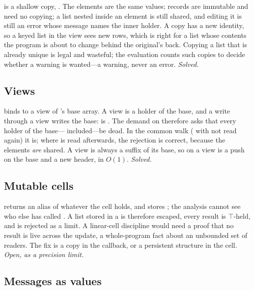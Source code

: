  is a shallow copy, . The elements
are the same values; records are immutable and need no copying; a list nested inside an element is
still shared, and editing it is still an error whose message names the inner holder. A copy has a new
identity, so a keyed list in the view sees new rows, which is right for a list whose contents the
program is about to change behind the original's back. Copying a list that is already unique is legal
and wasteful; the evaluation counts such copies to decide whether a warning is wanted---a warning, never
an error. \emph{Solved.}

\subsection{Views}
\label{sec:hard-views}

\code{[ x, …rest ]} binds  to a view of 's base array. A view is a holder of the base,
and a write through a view writes the base:  is . The demand
on  therefore asks that every holder of the base--- included---be dead. In the common
walk ( with  not read again) it is; where  is read afterwards, the
rejection is correct, because the elements \emph{are} shared. A view is always a suffix of its base, so
 on a view is a push on the base and a new header, in $O(1)$. \emph{Solved.}

\subsection{Mutable cells}
\label{sec:hard-ref}

 returns an alias of whatever the cell holds, and  stores ;
the analysis cannot see who else has called . A list stored in a  is therefore
escaped, every  result is $\top$-held, and  is
rejected as a limit. A linear-cell discipline would need a proof that no  result is live
across the update, a whole-program fact about an unbounded set of readers. The fix is a copy in the
callback, or a persistent structure in the cell. \emph{Open, as a precision limit.}

\subsection{Messages as values}
\label{sec:hard-messages}

